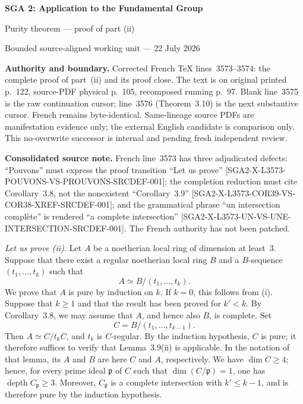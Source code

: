 \documentclass[10pt,a4paper]{article}
\newcommand{\depthop}{\operatorname{depth}}
\begin{document}
\begin{center}
  {\Large\bfseries SGA 2: Application to the Fundamental Group}\par\smallskip
  {\large Purity theorem --- proof of part \textup{(ii)}}\par
  {\normalsize Bounded source-aligned working unit --- 22 July 2026}
\end{center}

\noindent\colorbox{softgray}{\parbox{0.95\linewidth}{\footnotesize\textbf{Authority and boundary.}
Corrected French TeX lines~3573--3574: the complete proof of part~\textup{(ii)}
and its proof close. The text is on original printed p.~122, source-PDF physical
p.~105, recomposed running p.~97. Blank line~3575 is the raw continuation
cursor; line~3576 (Theorem~3.10) is the next substantive cursor. French remains
byte-identical. Same-lineage source PDFs are manifestation evidence only; the
external English candidate is comparison only. This no-overwrite successor is
internal and pending fresh independent review.}}

\medskip
\noindent\colorbox{softblue}{\parbox{0.95\linewidth}{\footnotesize
\textbf{Consolidated source note.}
French line~3573 has three adjudicated defects: ``Pouvons'' must express the
proof transition ``Let us prove''
[SGA2-X-L3573-POUVONS-VS-PROUVONS-SRCDEF-001]; the completion reduction must
cite Corollary~3.8, not the nonexistent ``Corollary~3.9''
[SGA2-X-L3573-COR39-VS-COR38-XREF-SRCDEF-001]; and the grammatical phrase
``un intersection compl\`ete'' is rendered ``a complete intersection''
[SGA2-X-L3573-UN-VS-UNE-INTERSECTION-SRCDEF-001]. The French authority has not
been patched.}}

\medskip
\textit{Let us prove \textup{(ii)}.}
Let $A$ be a noetherian local ring of dimension at least~$3$. Suppose that
there exist a regular noetherian local ring $B$ and a $B$-sequence
$(t_1,\ldots,t_k)$ such that
\[
  A\simeq B/(t_1,\ldots,t_k).
\]
We prove that $A$ is pure by induction on $k$. If $k=0$, this follows from
\textup{(i)}. Suppose that $k\geq1$ and that the result has been proved for
$k'<k$. By Corollary~3.8, we may assume that $A$, and hence also $B$, is
complete. Set
\[
  C=B/(t_1,\ldots,t_{k-1}).
\]
Then $A\simeq C/t_kC$, and $t_k$ is $C$-regular. By the induction hypothesis,
$C$ is pure; it therefore suffices to verify that Lemma~3.9\textup{(ii)} is
applicable. In the notation of that lemma, its $A$ and $B$ are here $C$ and
$A$, respectively. We have $\dim C\geq4$; hence, for every prime ideal
$\mathfrak p$ of $C$ such that $\dim(C/\mathfrak p)=1$, one has
$\depthop C_{\mathfrak p}\geq3$. Moreover, $C_{\mathfrak p}$ is a complete
intersection with $k'\leq k-1$, and is therefore pure by the induction
hypothesis.
\end{document}
